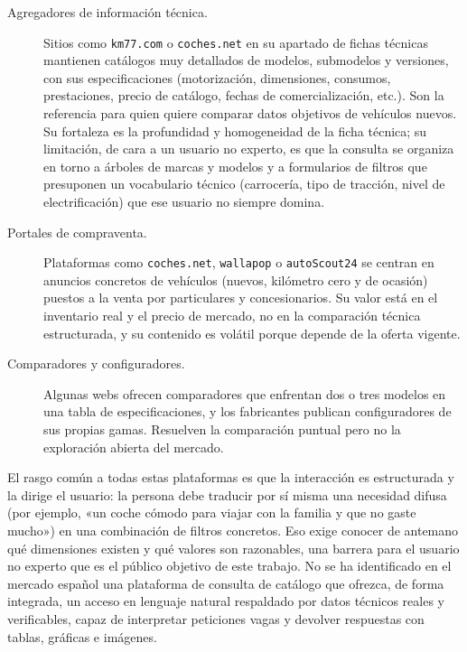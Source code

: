 \begin{description}
  \item[Agregadores de información técnica.] Sitios como \texttt{km77.com} o
        \texttt{coches.net} en su apartado de fichas técnicas mantienen catálogos
        muy detallados de modelos, submodelos y versiones, con sus
        especificaciones (motorización, dimensiones, consumos, prestaciones,
        precio de catálogo, fechas de comercialización, etc.). Son la referencia
        para quien quiere comparar datos objetivos de vehículos nuevos. Su
        fortaleza es la profundidad y homogeneidad de la ficha técnica; su
        limitación, de cara a un usuario no experto, es que la consulta se
        organiza en torno a árboles de marcas y modelos y a formularios de
        filtros que presuponen un vocabulario técnico (carrocería, tipo de
        tracción, nivel de electrificación) que ese usuario no siempre domina.

  \item[Portales de compraventa.] Plataformas como \texttt{coches.net},
        \texttt{wallapop} o \texttt{autoScout24} se centran en anuncios concretos
        de vehículos (nuevos, kilómetro cero y de ocasión) puestos a la venta por
        particulares y concesionarios. Su valor está en el inventario real y el
        precio de mercado, no en la comparación técnica estructurada, y su
        contenido es volátil porque depende de la oferta vigente.

  \item[Comparadores y configuradores.] Algunas webs ofrecen comparadores que
        enfrentan dos o tres modelos en una tabla de especificaciones, y los
        fabricantes publican configuradores de sus propias gamas. Resuelven la
        comparación puntual pero no la exploración abierta del mercado.
\end{description}

El rasgo común a todas estas plataformas es que la interacción es estructurada y
la dirige el usuario: la persona debe traducir por sí misma una necesidad difusa
(por ejemplo, «un coche cómodo para viajar con la familia y que no gaste mucho»)
en una combinación de filtros concretos. Eso exige conocer de antemano qué
dimensiones existen y qué valores son razonables, una barrera para el usuario no
experto que es el público objetivo de este trabajo. No se ha identificado en el
mercado español una plataforma de consulta de catálogo que ofrezca, de forma
integrada, un acceso en lenguaje natural respaldado por datos técnicos reales y
verificables, capaz de interpretar peticiones vagas y devolver respuestas con
tablas, gráficas e imágenes.


